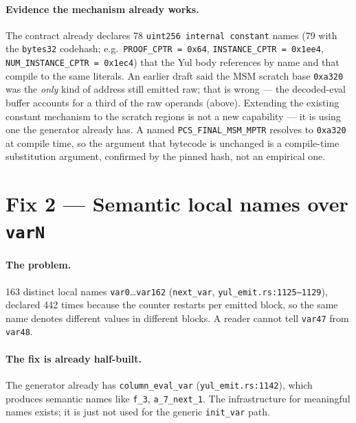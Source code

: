\paragraph{Evidence the mechanism already works.} The contract already
declares 78 \texttt{uint256 internal constant} names (79 with the
\texttt{bytes32} codehash; e.g.\
\texttt{PROOF\_\allowbreak{}CPTR = 0x64}, \texttt{INSTANCE\_\allowbreak{}CPTR = 0x1ee4},
\texttt{NUM\_\allowbreak{}INSTANCE\_\allowbreak{}CPTR = 0x1ec4}) that the Yul body
references by name and that compile to the same literals. An earlier draft
said the MSM scratch base \texttt{0xa320} was the \emph{only} kind of address
still emitted raw; that is wrong --- the decoded-eval buffer accounts for a
third of the raw operands (above). Extending the existing constant mechanism
to the scratch regions is not a new capability --- it is using one the
generator already has. A named \texttt{PCS\_\allowbreak{}FINAL\_\allowbreak{}MSM\_\allowbreak{}MPTR} resolves to
\texttt{0xa320} at compile time, so the argument that bytecode is unchanged
is a compile-time substitution argument, confirmed by the pinned hash, not an
empirical one.

\section{Fix 2 --- Semantic local names over \texttt{varN}}
\label{sec:read-varnames}

\paragraph{The problem.} 163 distinct local names \texttt{var0}\ldots\texttt{var162}
(\texttt{next\_var}, \texttt{yul\_\allowbreak{}emit.rs:1125--1129}), declared 442 times
because the counter restarts per emitted block, so the same name denotes
different values in different blocks. A reader cannot tell
\texttt{var47} from \texttt{var48}.

\paragraph{The fix is already half-built.} The generator already has
\texttt{column\_eval\_var} (\texttt{yul\_emit.rs:1142}), which produces
semantic names like \texttt{f\_3}, \texttt{a\_7\_next\_1}. The infrastructure
for meaningful names exists; it is just not used for the generic
\texttt{init\_var} path.

